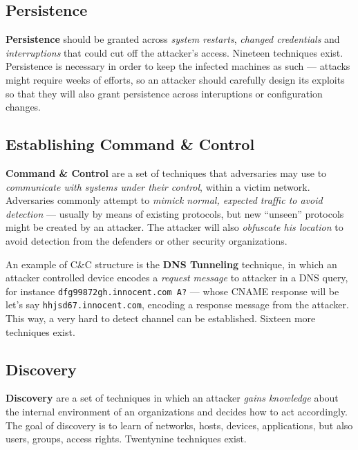 \documentclass[10pt]{\classname}
\begin{document}
\subsection{Persistence}

\textbf{Persistence} should be granted across \emph{system restarts},
\emph{changed credentials} and \emph{interruptions} that could cut off the
attacker's access. Nineteen techniques exist. Persistence is necessary in order
to keep the infected machines as such --- attacks might require weeks of
efforts, so an attacker should carefully design its exploits so that they will
also grant persistence across interuptions or configuration changes.

\subsection{Establishing Command \& Control}

\textbf{Command \& Control} are a set of techniques that adversaries may use
to \emph{communicate with systems under their control}, within a victim
network. Adversaries commonly attempt to \emph{mimick normal, expected traffic
to avoid detection} --- usually by means of existing protocols, but new
``unseen'' protocols might be created by an attacker. The attacker will also
\emph{obfuscate his location} to avoid detection from the defenders or other
security organizations.

An example of C\&C structure is the \textbf{DNS Tunneling} technique, in which
an attacker controlled device encodes a \emph{request message} to attacker in a
DNS query, for instance \texttt{dfg99872gh\-.innocent.com A?} --- whose CNAME
response will be let's say \texttt{hhjsd67\-.innocent.com}, encoding a response
message from the attacker. This way, a very hard to detect channel can be
established. Sixteen more techniques exist.

\subsection{Discovery}

\textbf{Discovery} are a set of techniques in which an attacker \emph{gains
knowledge} about the internal environment of an organizations and decides how
to act accordingly. The goal of discovery is to learn of networks, hosts, devices,
applications, but also users, groups, access rights. Twentynine techniques
exist.
\end{document}
